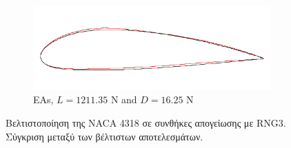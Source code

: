 \documentclass[twoside, 12pt,notitlepage]{report}
\begin{document}
\begin{enumerate}
\begin{figure}[h!]
\begin{subfigure}[b]{0.44\textwidth}
	\centering
	\caption{EAs, $L \!= \!1211.35$ N and $D \!= \!16.25$ N}
	\includegraphics[width=\textwidth, scale=1]{takeoff_SOO_EAs}   
	\end{subfigure}
\caption{Βελτιστοποίηση της NACA 4318 σε συνθήκες απογείωσης με 
RNG3. Σύγκριση μεταξύ των βέλτιστων αποτελεσμάτων.} 
\end{figure}

\vspace{-4mm}


\end{enumerate}
\end{document}
